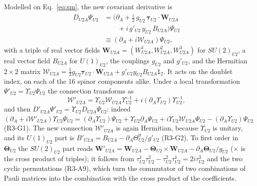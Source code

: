 Modelled on Eq.~\eqref{eq:sm}, the new covariant derivative is
\begin{equation}
\begin{aligned}
D_{U2A}\Psi_{U2}&=\Big(\partial_A+\tfrac i2\,g_{U2}\,\boldsymbol\tau_{U2}\cdot\boldsymbol W_{U2A}\\
&\qquad+i\,g'_{U2}\,y_{U2}\,B_{U2A}\Big)\Psi_{U2}\\
&\equiv(\partial_A+i\mathcal W_{U2A})\Psi_{U2},
\end{aligned}
\label{eq:D}
\end{equation}
with a triple of real vector fields $\boldsymbol W_{U2A}=(W^1_{U2A},W^2_{U2A},W^3_{U2A})$ for
$SU(2)_{U2}$, a real vector field $B_{U2A}$ for $U(1)_{U2}$, the couplings $g_{U2}$ and $g'_{U2}$,
and the Hermitian $2\times2$ matrix $\mathcal W_{U2A}=\tfrac12g_{U2}\boldsymbol\tau_{U2}\cdot\boldsymbol
W_{U2A}+g'_{U2}y_{U2}B_{U2A}\mathsf 1_2$. It acts on the doublet index, on each of the 16 spinor
components alike. Under a local transformation $\Psi'_{U2}=\Upsilon_{U2}\Psi_{U2}$ the connection
transforms as
\begin{equation}
\mathcal W'_{U2A}=\Upsilon_{U2}\mathcal W_{U2A}\Upsilon^{-1}_{U2}+i(\partial_A\Upsilon_{U2})\Upsilon^{-1}_{U2},
\label{eq:Wtrans}
\end{equation}
and then $D'_{U2A}\Psi'_{U2}=\Upsilon_{U2}D_{U2A}\Psi_{U2}$: indeed
$(\partial_A+i\mathcal W'_{U2A})\Upsilon_{U2}\Psi_{U2}=(\partial_A\Upsilon_{U2})\Psi_{U2}+\Upsilon_{U2}\partial_A\Psi_{U2}
+i\Upsilon_{U2}\mathcal W_{U2A}\Psi_{U2}-(\partial_A\Upsilon_{U2})\Psi_{U2}$ (R3-G1). The new connection
$\mathcal W'_{U2A}$ is again Hermitian, because $\Upsilon_{U2}$ is unitary, and its $U(1)_{U2}$ part
is $B'_{U2A}=B_{U2A}-\partial_A\Theta^0_{U2}/g'_{U2}$ (R3-G2). To first order in
$\boldsymbol\Theta_{U2}$ the $SU(2)_{U2}$ part reads
$\boldsymbol W'_{U2A}=\boldsymbol W_{U2A}-\boldsymbol\Theta_{U2}\times\boldsymbol W_{U2A}
-\partial_A\boldsymbol\Theta_{U2}/g_{U2}$ ($\times$ is the cross product of triples); it follows from
$\tau^1_{U2}\tau^2_{U2}-\tau^2_{U2}\tau^1_{U2}=2i\tau^3_{U2}$ and the two cyclic permutations (R3-A9),
which turn the commutator of two combinations of Pauli matrices into the combination with the
cross product of the coefficients.

